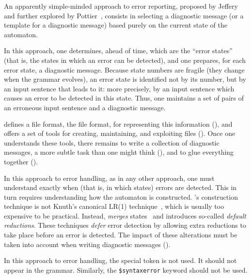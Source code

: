 \documentclass[onecolumn,11pt,nocopyrightspace,preprint]{sigplanconf}
\begin{document}
An apparently simple-minded approach to error reporting,
proposed by Jeffery~\citeyear{jeffery-03} and further explored by
Pottier~\citeyear{pottier-reachability-cc-2016}, consists in selecting a diagnostic
message (or a template for a diagnostic message) based purely on the current
state of the automaton.

In this approach, one determines, ahead of time, which are the ``error
states'' (that is, the states in which an error can be detected), and one
prepares, for each error state, a diagnostic message. Because state numbers
are fragile (they change when the grammar evolves), an error state is
identified not by its number, but by an input sentence that leads to it: more
precisely, by an input sentence which causes an error to be detected in this
state. Thus, one maintains a set of pairs of an erroneous input sentence and a
diagnostic message.

\menhir defines a file format, the \messages file format,
for representing this information (), and offers a
set of tools for creating, maintaining, and exploiting \messages files
(). Once one understands these tools, there remains
to write a collection of diagnostic messages, a more subtle task than one
might think (), and to glue everything together
().

In this approach to error handling, as in any other approach, one must
understand exactly when (that is, in which states) errors are detected.
This in turn requires understanding how the automaton is constructed.
\menhir's construction technique is not Knuth's canonical LR(1)
technique~\cite{knuth-lr-65}, which is usually too expensive to be practical.
Instead, \menhir \emph{merges} states~\cite{pager-77} and introduces so-called \emph{default
reductions}. These techniques \emph{defer} error detection by allowing
extra reductions to take place before an error is detected.
The impact of these alterations must be taken into account when writing
diagnostic messages ().

In this approach to error handling, the special \error token is not used. It
should not appear in the grammar. Similarly, the \verb+$syntaxerror+ keyword
should not be used.

\end{document}
